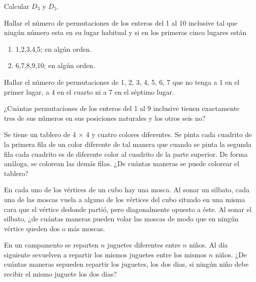 \documentclass[12pt]{article}
\begin{document}
\begin{ejercicio}
    Calcular $D_3$ y $D_5$.
\end{ejercicio}

\begin{ejercicio}
    Hallar el número de permutaciones de los enteros del 1 al 10 inclusive tal que ningún número esta en su lugar habitual y si en los primeros cinco lugares están

    \renewcommand{\labelenumi}{\alph{enumi})}
    \begin{enumerate}
        \item 1,2,3,4,5; en algún orden.
        \item 6,7,8,9,10; en algún orden.
    \end{enumerate}
\end{ejercicio}

\begin{ejercicio}
    Hallar el número de permutaciones de 1, 2, 3, 4, 5, 6, 7 que no tenga a 1 en el primer lugar, a 4 en el cuarto ni a 7 en el séptimo lugar.
\end{ejercicio}

\begin{ejercicio}
    ¿Cuántas permutaciones de los enteros del 1 al 9 inclusive tienen exactamente tres de sus números en sus posiciones naturales y los otros seis no?
\end{ejercicio}

\begin{ejercicio}
    Se tiene un tablero de 4 × 4 y cuatro colores diferentes. Se pinta cada cuadrito de la primera fila de un color diferente de tal manera que cuando se pinta la segunda fila cada cuadrito es de diferente color al cuadrito de la parte superior. De forma análoga, se colorean las demás filas. ¿De cuántas maneras se puede colorear el tablero?
\end{ejercicio}

\begin{ejercicio}
    En cada uno de los vértices de un cubo hay una mosca. Al sonar un silbato, cada una de las moscas vuela a alguno de los vértices del cubo situado en una misma cara que el vértice dedonde partió, pero diagonalmente opuesto a éste. Al sonar el silbato, ¿de cuántas maneras pueden volar las moscas de modo que en ningún vértice queden dos o más moscas.
\end{ejercicio}

\begin{ejercicio}
    En un campamento se reparten $n$ juguetes diferentes entre $n$ niños. Al día siguiente sevuelven a repartir los mismos juguetes entre los mismos $n$ niños. ¿De cuántas maneras sepueden repartir los juguetes, los dos dias, si ningún niño debe recibir el mismo juguete los dos días?
\end{ejercicio}
\end{document}
